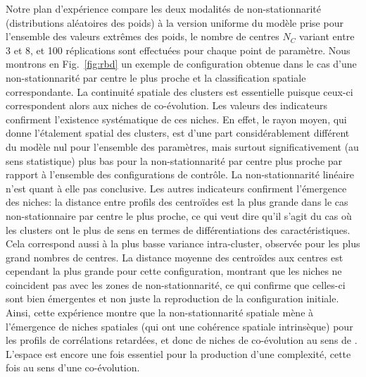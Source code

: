 \documentclass[11pt]{article}
\begin{document}
Notre plan d'expérience compare les deux modalités de non-stationnarité (distributions aléatoires des poids) à la version uniforme du modèle prise pour l'ensemble des valeurs extrêmes des poids, le nombre de centres $N_C$ variant entre 3 et 8, et 100 réplications sont effectuées pour chaque point de paramètre. Nous montrons en Fig.~\ref{fig:rbd} un exemple de configuration obtenue dans le cas d'une non-stationnarité par centre le plus proche et la classification spatiale correspondante. La continuité spatiale des clusters est essentielle puisque ceux-ci correspondent alors aux niches de co-évolution. Les valeurs des indicateurs confirment l'existence systématique de ces niches. En effet, le rayon moyen, qui donne l'étalement spatial des clusters, est d'une part considérablement différent du modèle nul pour l'ensemble des paramètres, mais surtout significativement (au sens statistique) plus bas pour la non-stationnarité par centre plus proche par rapport à l'ensemble des configurations de contrôle. La non-stationnarité linéaire n'est quant à elle pas conclusive. Les autres indicateurs confirment l'émergence des niches: la distance entre profils des centroïdes est la plus grande dans le cas non-stationnaire par centre le plus proche, ce qui veut dire qu'il s'agit du cas où les clusters ont le plus de sens en termes de différentiations des caractéristiques. Cela correspond aussi à la plus basse variance intra-cluster, observée pour les plus grand nombres de centres. La distance moyenne des centroïdes aux centres est cependant la plus grande pour cette configuration, montrant que les niches ne coincident pas avec les zones de non-stationnarité, ce qui confirme que celles-ci sont bien émergentes et non juste la reproduction de la configuration initiale. Ainsi, cette expérience montre que la non-stationnarité spatiale mène à l'émergence de niches spatiales (qui ont une cohérence spatiale intrinsèque) pour les profils de corrélations retardées, et donc de niches de co-évolution au sens de \cite{raimbault2018caracterisation}. L'espace est encore une fois essentiel pour la production d'une complexité, cette fois au sens d'une co-évolution.








\end{document}
